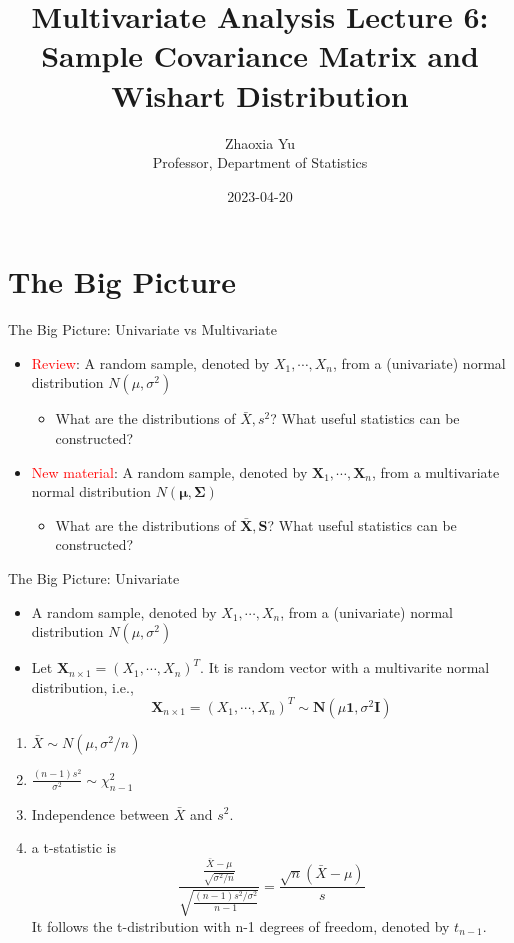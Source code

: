 \documentclass[
  ignorenonframetext,
]{beamer}
\title{Multivariate Analysis Lecture 6: Sample Covariance Matrix and
Wishart Distribution}
\author{Zhaoxia Yu\\
Professor, Department of Statistics}
\date{2023-04-20}
\providecommand{\tightlist}{%
  \setlength{\itemsep}{0pt}\setlength{\parskip}{0pt}}
\begin{document}
\frame{\titlepage}

\hypertarget{the-big-picture}{%
\section{The Big Picture}\label{the-big-picture}}

\begin{frame}{The Big Picture: Univariate vs Multivariate}
\protect\hypertarget{the-big-picture-univariate-vs-multivariate}{}
\begin{itemize}
\tightlist
\item
  \textcolor{red}{Review}: A random sample, denoted by
  \(X_1, \cdots, X_n\), from a (univariate) normal distribution
  \(N(\mu, \sigma^2)\)

  \begin{itemize}
  \tightlist
  \item
    What are the distributions of \(\bar X, s^2\)? What useful
    statistics can be constructed?
  \end{itemize}
\item
  \textcolor{red}{New material}: A random sample, denoted by
  \(\mathbf X_1, \cdots, \mathbf X_n\), from a multivariate normal
  distribution \(N(\boldsymbol \mu, \boldsymbol \Sigma)\)

  \begin{itemize}
  \tightlist
  \item
    What are the distributions of \(\bar{\mathbf X}, \mathbf S\)? What
    useful statistics can be constructed?
  \end{itemize}
\end{itemize}
\end{frame}

\begin{frame}{The Big Picture: Univariate}
\protect\hypertarget{the-big-picture-univariate}{}
\begin{itemize}
\tightlist
\item
  A random sample, denoted by \(X_1, \cdots, X_n\), from a (univariate)
  normal distribution \(N(\mu, \sigma^2)\)
\item
  Let \(\mathbf X_{n\times 1}=(X_1, \cdots, X_n)^T\). It is random
  vector with a multivarite normal distribution, i.e.,
  \[\mathbf X_{n\times 1}=(X_1, \cdots, X_n)^T \sim \mathbf N(\mu\mathbf 1, \sigma^2\mathbf I)\]
\end{itemize}

\begin{enumerate}
\tightlist
\item
  \(\bar X \sim N(\mu, \sigma^2/n)\)
\item
  \(\frac{(n-1)s^2}{\sigma^2} \sim \chi_{n-1}^2\)
\item
  Independence between \(\bar X\) and \(s^2\).
\item
  a t-statistic is
  \[\frac{\frac{\bar X-\mu}{\sqrt{\sigma^2/n}}}{\sqrt{\frac{(n-1)s^2/\sigma^2}{n-1}}}=\frac{\sqrt{n}(\bar X-\mu)}{s}\]
  It follows the t-distribution with n-1 degrees of freedom, denoted by
  \(t_{n-1}\).
\end{enumerate}
\end{frame}
\end{document}
